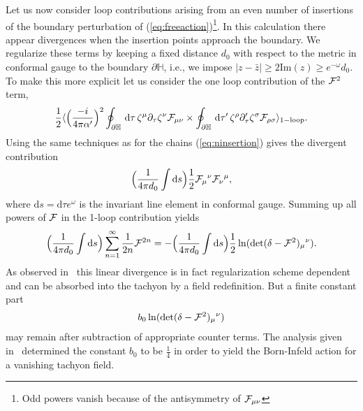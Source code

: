 \documentclass[a4paper,12pt]{article}
\let\bra=\langle        \let\ket=\rangle
\newcommand {\ud} {\mathrm{d}}
\newcommand {\cF} {{\cal F}}
\newcommand {\bbH}{\mathbb{H}}
\newcommand {\im} {\mathrm{Im}}
\begin{document}
Let us now consider loop 
contributions arising from an even number of insertions of the boundary 
perturbation of (\ref{eq:freeaction})\footnote{Odd powers vanish because of 
the antisymmetry of $\cF_{\mu\nu}$}. In this calculation there appear
divergences when the insertion points approach the boundary. We regularize
these terms by keeping a fixed distance $d_0$ with respect to the
metric in conformal gauge to the boundary $\partial \bbH$, i.e., we impose
$|z - \bar z| \geq 2\im (z) \ge e^{-\omega} d_0$. To make this more explicit 
let us consider the one loop contribution of the $\cF^2$ term,
\begin{eqnarray}
  \label{eq:F2loop}
  \frac 12 
    \bra \Bigl( \frac {-i}{4\pi\alpha'} \Bigr)^2
      \oint _{\partial\bbH} \, \ud \tau \,
      {\zeta^\mu \partial_\tau \zeta^\nu \cF_{\mu\nu}} \times
      \oint _{\partial\bbH} \, \ud \tau' \,
      {\zeta^\rho \partial_\tau' \zeta^\sigma \cF_{\rho\sigma}} 
      \ket_\mathrm{1-loop}.
\end{eqnarray}
Using the same techniques as for the chains (\ref{eq:ninsertion}) gives the
divergent contribution
\begin{eqnarray}
  \label{eq:F2loopresult}
  \Bigl( \frac 1{4\pi d_0} \int \ud s \Bigr) 
  \frac 12 \cF_\mu{}^\nu \cF_\nu{}^\mu,
\end{eqnarray}
where $\ud s = \ud\tau e^\omega$ is the invariant line element in
conformal gauge. Summing up all powers of $\cF$ in the 1-loop 
contribution yields
\begin{eqnarray}
  \label{eq:allFloop}
  \Bigl(\frac 1{4\pi d_0} \int \ud s\Bigr) 
  \sum_{n=1}^\infty \frac 1{2n} \cF^{2n} = 
  - \Bigl(\frac 1{4\pi d_0} \int \ud s\Bigr) 
  \frac 12 \ln (\det (\delta - \cF^2)_\mu{}^\nu).  
\end{eqnarray}
As observed in~\cite{Tseytlin:1986zz,Tseytlin:2000mt} this linear divergence 
is in fact regularization scheme dependent and can be absorbed into the 
tachyon by a field redefinition. But a finite constant part
\begin{eqnarray}
  \label{eq:allFfinit}
  b_0 \ln (\det (\delta - \cF^2)_\mu{}^\nu)
\end{eqnarray}
may remain after subtraction of appropriate counter terms. The
analysis given in~\cite{Fradkin:1985qd,Tseytlin:2000mt} 
determined the constant
$b_0$ to be $\frac 14$ in order to yield the Born-Infeld action
for a vanishing tachyon field.
\end{document}
